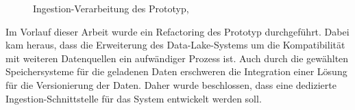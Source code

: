 \begin{figure}
    \centering
    \caption[Ingestion-Verarbeitung des Prototyp]{Ingestion-Verarbeitung des Prototyp, }
    \label{fig:prototyp-ingestion}
\end{figure}

Im Vorlauf dieser Arbeit wurde ein Refactoring des Prototyp durchgeführt.
Dabei kam heraus, dass die Erweiterung des Data-Lake-Systems um die Kompatibilität mit weiteren Datenquellen ein aufwändiger Prozess ist.
Auch durch die gewählten Speichersysteme für die geladenen Daten erschweren die Integration einer Lösung für die Versionierung der Daten.
Daher wurde beschlossen, dass eine dedizierte Ingestion-Schnittstelle für das System entwickelt werden soll.